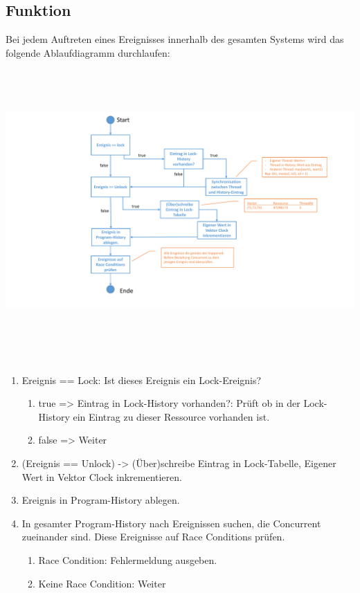 \documentclass[10pt,a4paper]{article}
\begin{document}
\subsection{Funktion}
\begin{flushleft}
Bei jedem Auftreten eines Ereignisses innerhalb des gesamten Systems wird das folgende Ablaufdiagramm durchlaufen:\\[0,5cm]
	\includegraphics[width=16cm,height=11.5cm,trim=60mm 0mm 20mm 0mm, clip]{pictures/Ablaufdiagramm_Algorithmus.pdf}\\

\begin{enumerate}
\item \flqq Ereignis == Lock\frqq: Ist dieses Ereignis ein Lock-Ereignis?
	\begin{enumerate}
	\item true 	=> Eintrag in Lock-History vorhanden?: Prüft ob in der Lock-History ein Eintrag zu dieser Ressource vorhanden ist.
	\item false =>  Weiter
	\end{enumerate}
\item (Ereignis == Unlock) -> (Über)schreibe Eintrag in Lock-Tabelle, Eigener Wert in Vektor Clock inkrementieren.
\item Ereignis in Program-History ablegen.
\item In gesamter Program-History nach Ereignissen suchen, die Concurrent zueinander sind. Diese Ereignisse auf Race Conditions prüfen.
	\begin{enumerate}
	\item Race Condition: Fehlermeldung ausgeben.
	\item Keine Race Condition: Weiter
	\end{enumerate}
\end{enumerate}
\end{flushleft}
\end{document}
